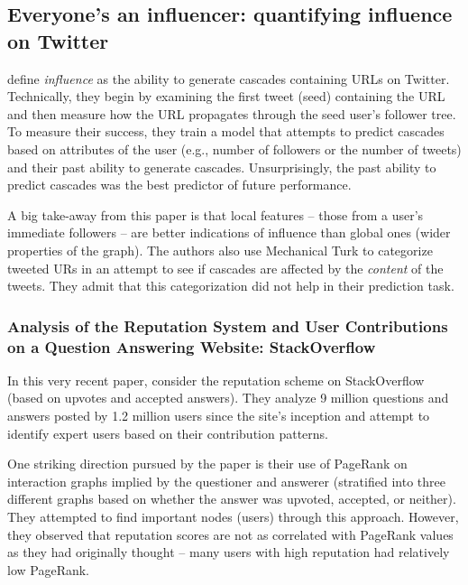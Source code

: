 \documentclass[10pt]{article}
\begin{document}
\subsection{Everyone's an influencer: quantifying influence on Twitter \citep{bakshy2011everyone}}

\citet{bakshy2011everyone} define \textit{influence} as the ability to generate
cascades containing URLs on Twitter. Technically, they begin by examining the
first tweet (seed) containing the URL and then measure how the URL propagates
through the seed user's follower tree. To measure their success, they train a
model that attempts to predict cascades based on attributes of the user (e.g.,
number of followers or the number of tweets) and their past ability to generate
cascades.  Unsurprisingly, the past ability to predict cascades was the best
predictor of future performance.

A big take-away from this paper is that local features -- those from a user's
immediate followers -- are better indications of influence than global ones
(wider properties of the graph). The authors also use Mechanical Turk to
categorize tweeted URs in an attempt to see if cascades are affected by the
\textit{content} of the tweets. They admit that this categorization did not help
in their prediction task. 

\subsubsection{Analysis of the Reputation System and User Contributions on a
  Question Answering Website: StackOverflow
  \citep{movshovitzanalysis}}

In this very recent paper, \citet{movshovitzanalysis} consider the reputation
scheme on StackOverflow (based on upvotes and accepted answers). They analyze 9
million questions and answers posted by 1.2 million users since the site's
inception and attempt to identify expert users based on their contribution
patterns.

One striking direction pursued by the paper is their use of PageRank on
interaction graphs implied by the questioner and answerer (stratified into three
different graphs based on whether the answer was upvoted, accepted, or neither).
They attempted to find important nodes (users) through this approach. However,
they observed that reputation scores are not as correlated with PageRank values
as they had originally thought -- many users with high reputation had
relatively low PageRank.
\end{document}
